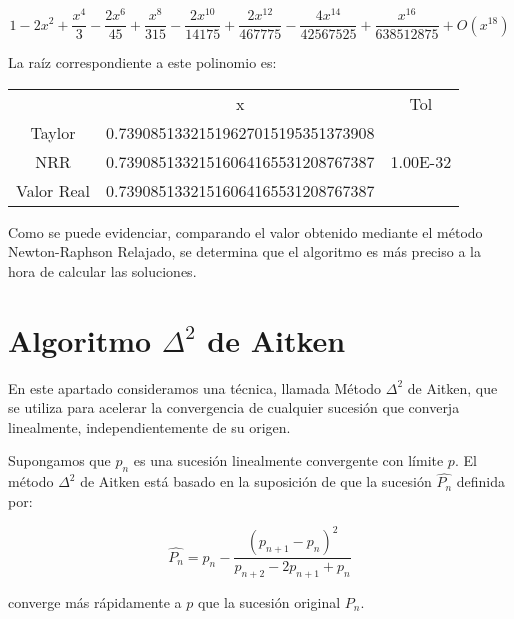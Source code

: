 \documentclass[a4paper,12pt]{article}
\begin{document}
\[ 1 - 2 x^2 + \frac{x^4}{3} - \frac{2x^6}{45} + \frac{x^8}{315} - \frac{2 x^{10}}{14175} + \frac{2 x^{12}}{467775} - \frac{4x^{14}}{42567525} + \frac{x^{16}}{638512875} + O(x^{18}) \]

La raíz correspondiente a este polinomio es: \par

\begin{table}[ht!]
\begin{tabular}{clc}
\multicolumn{1}{l}{} & \multicolumn{1}{c}{x}              & Tol                  \\
Taylor               & 0.73908513321519627015195351373908 &                      \\
NRR                  & 0.73908513321516064165531208767387 & 1.00E-32             \\
Valor Real           & 0.73908513321516064165531208767387 & \multicolumn{1}{l}{}
\end{tabular}
\end{table}

Como se puede evidenciar, comparando el valor obtenido mediante el método Newton-Raphson Relajado, se determina que el algoritmo es más preciso a la hora de calcular las soluciones.

\newpage


\section{Algoritmo $\Delta^2$ de Aitken}

En este apartado consideramos una técnica, llamada Método $\Delta^2$ de Aitken, que se utiliza para acelerar la convergencia de cualquier sucesión que converja linealmente, independientemente de su origen. \par

Supongamos que $p_n$ es una sucesión linealmente convergente con límite $p$. El método $\Delta^2$ de Aitken está basado en la suposición de que la sucesión $\hat{P_n}$ definida por: \par

\[ \hat{P_n} = p_n - \frac{(p_{n+1} - p_n)^2}{p_{n+2} - 2p_{n+1} + p_n} \]

converge más rápidamente a $p$ que la sucesión original $P_n$. \par
\end{document}
